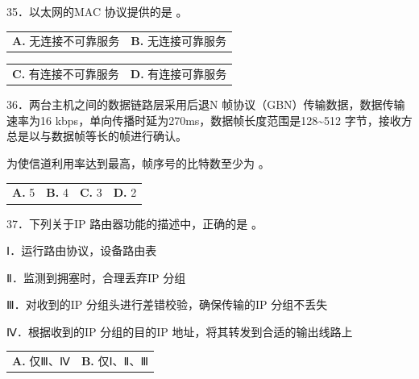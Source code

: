 \documentclass[UTF8,11pt]{ctexart}
\begin{document}
35．以太网的MAC 协议提供的是 。


\begin{center}\begin{tabular}{>{\raggedright\arraybackslash}p{\dimexpr(\linewidth-4\tabcolsep)/2\relax}>{\raggedright\arraybackslash}p{\dimexpr(\linewidth-4\tabcolsep)/2\relax}}
\textbf{A.} 无连接不可靠服务 & \textbf{B.} 无连接可靠服务\\[.35em]\end{tabular}\end{center}

\begin{center}\begin{tabular}{>{\raggedright\arraybackslash}p{\dimexpr(\linewidth-4\tabcolsep)/2\relax}>{\raggedright\arraybackslash}p{\dimexpr(\linewidth-4\tabcolsep)/2\relax}}
\textbf{C.} 有连接不可靠服务 & \textbf{D.} 有连接可靠服务\\[.35em]\end{tabular}\end{center}

36．两台主机之间的数据链路层采用后退N 帧协议（GBN）传输数据，数据传输速率为16 kbps，单向传播时延为270ms，数据帧长度范围是128\textasciitilde{}512 字节，接收方总是以与数据帧等长的帧进行确认。


为使信道利用率达到最高，帧序号的比特数至少为 。


\begin{center}\begin{tabular}{>{\raggedright\arraybackslash}p{\dimexpr(\linewidth-8\tabcolsep)/4\relax}>{\raggedright\arraybackslash}p{\dimexpr(\linewidth-8\tabcolsep)/4\relax}>{\raggedright\arraybackslash}p{\dimexpr(\linewidth-8\tabcolsep)/4\relax}>{\raggedright\arraybackslash}p{\dimexpr(\linewidth-8\tabcolsep)/4\relax}}
\textbf{A.} 5 & \textbf{B.} 4 & \textbf{C.} 3 & \textbf{D.} 2\\[.35em]\end{tabular}\end{center}

37．下列关于IP 路由器功能的描述中，正确的是 。


Ⅰ．运行路由协议，设备路由表


Ⅱ．监测到拥塞时，合理丢弃IP 分组


Ⅲ．对收到的IP 分组头进行差错校验，确保传输的IP 分组不丢失


Ⅳ．根据收到的IP 分组的目的IP 地址，将其转发到合适的输出线路上


\begin{center}\begin{tabular}{>{\raggedright\arraybackslash}p{\dimexpr(\linewidth-4\tabcolsep)/2\relax}>{\raggedright\arraybackslash}p{\dimexpr(\linewidth-4\tabcolsep)/2\relax}}
\textbf{A.} 仅Ⅲ、Ⅳ & \textbf{B.} 仅Ⅰ、Ⅱ、Ⅲ\\[.35em]\end{tabular}\end{center}
\end{document}
